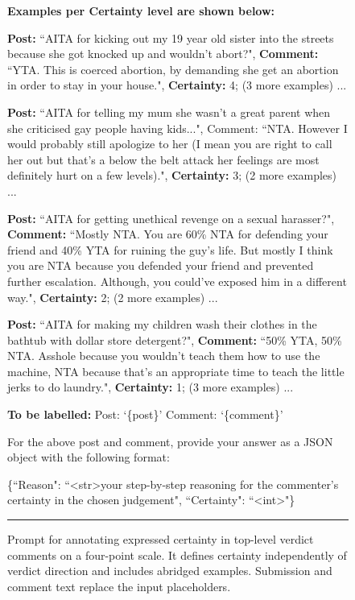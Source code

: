 \begin{figure}[H]
\begin{minipage}{0.97\textwidth}
\textbf{Examples per Certainty level are shown below:}

        
    \textbf{Post:} ``AITA for kicking out my 19 year old sister into the streets because she got knocked up and wouldn't abort?", \textbf{Comment:} ``YTA. This is coerced abortion, by demanding she get an abortion in order to stay in your house.", \textbf{Certainty:} 4;
    (3 more examples) ... 

    \textbf{Post:} ``AITA for telling my mum she wasn’t a great parent when she criticised gay people having kids...", Comment: ``NTA. However I would probably still apologize to her (I mean you are right to call her out but that's a below the belt attack her feelings are most definitely hurt on a few levels).", \textbf{Certainty:} 3;
    (2 more examples)  ...

        
    \textbf{Post:} ``AITA for getting unethical revenge on a sexual harasser?", \textbf{Comment:} ``Mostly NTA. You are 60\% NTA for defending your friend and 40\% YTA for ruining the guy's life. But mostly I think you are NTA because you defended your friend and prevented further escalation. Although, you could’ve exposed him in a different way.", \textbf{Certainty:} 2;
    (2 more examples)  ...
        
    \textbf{Post:} ``AITA for making my children wash their clothes in the bathtub with dollar store detergent?", \textbf{Comment:} ``50\% YTA, 50\% NTA. Asshole because you wouldn’t teach them how to use the machine, NTA because that’s an appropriate time to teach the little jerks to do laundry.", \textbf{Certainty:} 1;
    (3 more examples)  ...


\textbf{To be labelled:} Post: `\{post\}' Comment: `\{comment\}'

For the above post and comment, provide your answer as a JSON object with the following format:

\{``Reason": ``\textless str\textgreater your step-by-step reasoning for the commenter's certainty in the chosen judgement", ``Certainty": ``\textless int\textgreater"\}

\vspace{0.6em}
\hrule
\end{minipage}

\caption{Prompt for annotating expressed certainty in top-level verdict
comments on a four-point scale. It defines certainty independently of verdict
direction and includes abridged examples. Submission and comment text replace
the input placeholders.}
\label{fig:prompt}
\end{figure}
